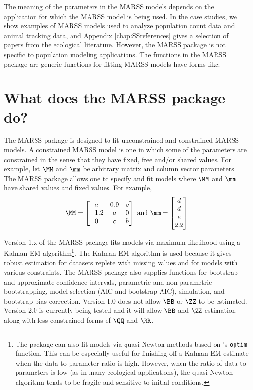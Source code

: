 The meaning of the parameters in the MARSS models depends on the application for which the MARSS model is being used.  In the case studies, we show examples of MARSS models used to analyze population count data and animal tracking data, and Appendix \ref{chap:SSreferences} gives a selection of papers from the ecological literature.  However, the MARSS package is not specific to population modeling applications.  The functions in the MARSS package are generic functions for fitting MARSS models have forms like: 

\section{What does the MARSS package do?}
The MARSS package is designed to fit unconstrained and constrained MARSS models.  A constrained MARSS model is one in which some of the parameters are constrained in the sense that they have fixed, free and/or shared values.  For example, let $\MM$ and $\mm$ be arbitrary matrix and column vector parameters.  The MARSS package allows one to specify and fit models where $\MM$ and $\mm$ have shared values and fixed values.  For example,
\begin{equation*}
\MM=
\begin{bmatrix}
a&0.9&c\\
-1.2&a&0\\
0&c&b
\end{bmatrix}
\text{ and }
\mm=
\begin{bmatrix}
d\\
d\\
e\\
2.2
\end{bmatrix}
\end{equation*}

Version 1.x of the MARSS package fits models via maximum-likelihood using a Kalman-EM algorithm\footnote{The package can also fit models via quasi-Newton methods based on \R's \texttt{optim} function. This can be especially useful for finishing off a Kalman-EM estimate  when the data to parameter ratio is high.  However, when the ratio of data to parameters is low (as in many ecological applications), the quasi-Newton algorithm tends to be fragile and sensitive to initial conditions.}.  The Kalman-EM algorithm is used because it gives robust estimation for datasets replete with missing values and for models with various constraints.  The MARSS package also supplies functions for bootstrap and approximate confidence intervals, parametric and non-parametric bootstrapping, model selection (AIC and bootstrap AIC), simulation, and bootstrap bias correction.   Version 1.0 does not allow $\BB$ or $\ZZ$ to be estimated.  Version 2.0 is currently being tested and it will allow $\BB$ and $\ZZ$ estimation along with less constrained forms of $\QQ$ and $\RR$.

